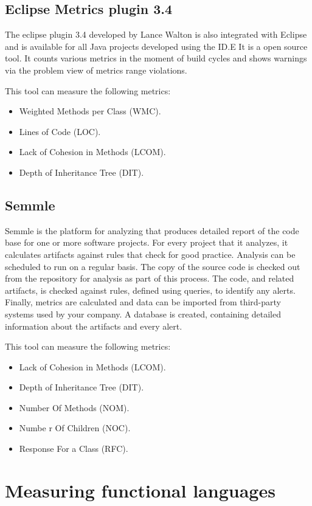 \subsection{Eclipse Metrics plugin 3.4}
The  eclipse  plugin  3.4 developed  by  Lance  Walton  is  also  integrated  with Eclipse   and   is   available   for   all   Java   projects 
developed using the ID.E It is a open source tool. It counts various metrics in the moment of build cycles and shows warnings via the problem view of metrics range violations.

This tool can measure the following metrics:
\begin{itemize}
	\item Weighted Methods per Class (WMC).
	\item Lines of Code (LOC). 
	\item Lack of Cohesion in Methods (LCOM).
	\item Depth of Inheritance Tree (DIT).
\end{itemize}

\subsection{Semmle}

Semmle is the platform for analyzing that produces detailed report of the code base for one or more software projects. For every project that it analyzes, it calculates artifacts against rules that check for good practice. Analysis can be scheduled to run on a regular basis. The copy of the source code is checked out from the repository for analysis as part of this process. The code, and related artifacts, is checked against rules, defined using queries, to identify any alerts. Finally, metrics are calculated and data can be imported from third-party systems used by your company. A database is created, containing detailed information about the artifacts and every alert.

This tool can measure the following metrics:
\begin{itemize}
	\item Lack of Cohesion in Methods (LCOM).
	\item Depth of Inheritance Tree (DIT).
	\item Number Of Methods (NOM).
	\item Numbe r Of Children (NOC).
	\item Response For a Class (RFC).
\end{itemize}

\section{Measuring functional languages}

